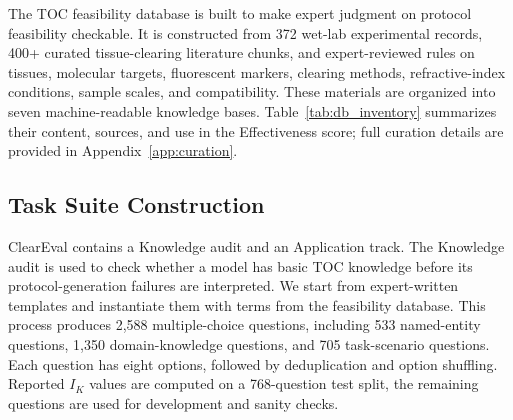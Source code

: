 \documentclass[conference]{IEEEtran}
\begin{document}
The TOC feasibility database is built to make expert judgment on protocol
feasibility checkable. It is constructed from 372 wet-lab experimental records,
400+ curated tissue-clearing literature chunks, and expert-reviewed rules on
tissues, molecular targets, fluorescent markers, clearing methods,
refractive-index conditions, sample scales, and compatibility. These materials
are organized into seven machine-readable knowledge bases. Table~\ref{tab:db_inventory}
summarizes their content, sources, and use in the Effectiveness score; full
curation details are provided in Appendix~\ref{app:curation}.

\begin{table}[htbp]
\centering
\caption{Knowledge base inventory for TOC evidence and scoring rules.}
\label{tab:db_inventory}
\setlength{\tabcolsep}{4pt}%
\end{table}

\subsection{Task Suite Construction}

ClearEval contains a Knowledge audit and an Application track. The Knowledge
audit is used to check whether a model has basic TOC knowledge before its
protocol-generation failures are interpreted. We start from expert-written
templates and instantiate them with terms from the feasibility database. This
process produces 2{,}588 multiple-choice questions, including 533 named-entity
questions, 1{,}350 domain-knowledge questions, and 705 task-scenario questions.
Each question has eight options, followed by deduplication and option
shuffling. Reported $I_K$ values are computed on a 768-question test
split, the remaining questions are used for development and sanity checks.
\end{document}
